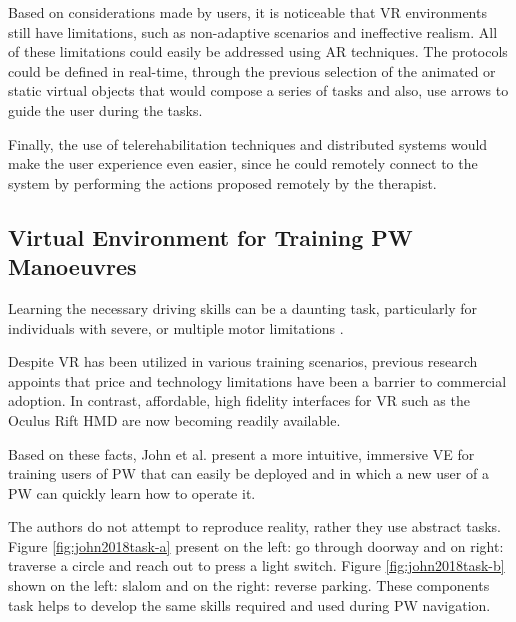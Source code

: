 Based on considerations made by users, it is noticeable that VR environments still have limitations, such as non-adaptive scenarios and ineffective realism. All of these limitations could easily be addressed using AR techniques. The protocols could be defined in real-time, through the previous selection of the animated or static virtual objects that would compose a series of tasks and also, use arrows to guide the user during the tasks.

Finally, the use of telerehabilitation techniques and distributed systems would make the user experience even easier, since he could remotely connect to the system by performing the actions proposed remotely by the therapist.

\subsection{Virtual Environment for Training PW Manoeuvres}
Learning the necessary driving skills can be a daunting task, particularly for individuals with severe, or multiple motor limitations \cite{rodriguez2015}. 

Despite VR has been utilized in various training scenarios, previous research appoints that price and technology limitations have been a barrier to commercial adoption.  In contrast, affordable, high fidelity interfaces for VR such as the Oculus Rift HMD are now becoming readily available. 

Based on these facts, John et al. \cite{john2018} present a more intuitive, immersive VE for training users of PW that can easily be deployed and in which a new user of a PW
can quickly learn how to operate it. 

The authors do not attempt to reproduce reality, rather they use abstract tasks.  Figure \ref{fig:john2018task-a} present on the left: go through doorway and on right: traverse a circle and reach out to press a light switch. Figure \ref{fig:john2018task-b} shown on the left: slalom and on the right: reverse parking. These components task helps to develop the same skills required and used during PW navigation.

